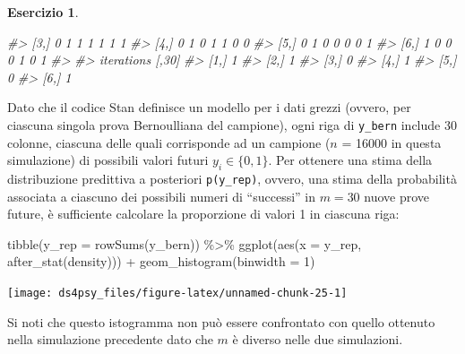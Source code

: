 \documentclass[
  11pt,
]{krantz}
\makeatletter
\newenvironment{Shaded}{\begin{snugshade}}{\end{snugshade}}
\newcommand{\AttributeTok}[1]{\textcolor[rgb]{0.61,0.61,0.61}{#1}}
\newcommand{\CommentTok}[1]{\textcolor[rgb]{0.37,0.37,0.37}{\textit{#1}}}
\newcommand{\DecValTok}[1]{\textcolor[rgb]{0.06,0.06,0.06}{#1}}
\newcommand{\FunctionTok}[1]{\textcolor[rgb]{0,0,0}{#1}}
\newcommand{\NormalTok}[1]{#1}
\newcommand{\SpecialCharTok}[1]{\textcolor[rgb]{0,0,0}{#1}}
\newenvironment{kframe}{%
\medskip{}
\setlength{\fboxsep}{.8em}
 \def\at@end@of@kframe{}%
 \ifinner\ifhmode%
  \def\at@end@of@kframe{\end{minipage}}%
  \begin{minipage}{\columnwidth}%
 \fi\fi%
 \def\FrameCommand##1{\hskip\@totalleftmargin \hskip-\fboxsep
 \colorbox{shadecolor}{##1}\hskip-\fboxsep
     \hskip-\linewidth \hskip-\@totalleftmargin \hskip\columnwidth}%
 \MakeFramed {\advance\hsize-\width
   \@totalleftmargin\z@ \linewidth\hsize
   \@setminipage}}%
 {\par\unskip\endMakeFramed%
 \at@end@of@kframe}
\renewenvironment{Shaded}{\begin{kframe}}{\end{kframe}}
\theoremstyle{definition}
\theoremstyle{definition}
\theoremstyle{definition}
\newtheorem{exercise}{Esercizio}[chapter]
\theoremstyle{definition}
\theoremstyle{remark}
\makeatother
\begin{document}
\begin{exercise}
\begin{Shaded}
\begin{Highlighting}[]
\CommentTok{\#\textgreater{}       [3,]     0     1     1     1     1     1     1}
\CommentTok{\#\textgreater{}       [4,]     0     1     0     1     1     0     0}
\CommentTok{\#\textgreater{}       [5,]     0     1     0     0     0     0     1}
\CommentTok{\#\textgreater{}       [6,]     1     0     0     0     1     0     1}
\CommentTok{\#\textgreater{}           }
\CommentTok{\#\textgreater{} iterations [,30]}
\CommentTok{\#\textgreater{}       [1,]     1}
\CommentTok{\#\textgreater{}       [2,]     1}
\CommentTok{\#\textgreater{}       [3,]     0}
\CommentTok{\#\textgreater{}       [4,]     1}
\CommentTok{\#\textgreater{}       [5,]     0}
\CommentTok{\#\textgreater{}       [6,]     1}
\end{Highlighting}
\end{Shaded}

Dato che il codice Stan definisce un modello per i dati grezzi (ovvero, per ciascuna singola prova Bernoulliana del campione), ogni riga di \texttt{y\_bern} include 30 colonne, ciascuna delle quali corrisponde ad un campione (\(n\) = 16000 in questa simulazione) di possibili valori futuri \(y_i \in \{0, 1\}\). Per ottenere una stima della distribuzione predittiva a posteriori \texttt{p(y\_rep)}, ovvero, una stima della probabilità associata a ciascuno dei possibili numeri di ``successi'' in \(m = 30\) nuove prove future, è sufficiente calcolare la proporzione di valori 1 in ciascuna riga:

\begin{Shaded}
\begin{Highlighting}[]
\FunctionTok{tibble}\NormalTok{(}\AttributeTok{y\_rep =} \FunctionTok{rowSums}\NormalTok{(y\_bern)) }\SpecialCharTok{\%\textgreater{}\%}
  \FunctionTok{ggplot}\NormalTok{(}\FunctionTok{aes}\NormalTok{(}\AttributeTok{x =}\NormalTok{ y\_rep, }\FunctionTok{after\_stat}\NormalTok{(density))) }\SpecialCharTok{+}
  \FunctionTok{geom\_histogram}\NormalTok{(}\AttributeTok{binwidth =} \DecValTok{1}\NormalTok{)}
\end{Highlighting}
\end{Shaded}

\begin{center}\texttt{[image: ds4psy\_files/figure-latex/unnamed-chunk-25-1]} \end{center}

Si noti che questo istogramma non può essere confrontato con quello ottenuto nella simulazione precedente dato che \(m\) è diverso nelle due simulazioni.
\end{exercise}
\end{document}
